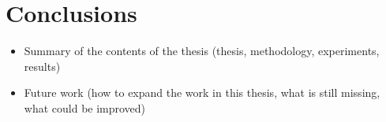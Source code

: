 \chapter{Conclusions}

\begin{itemize}
	\item Summary of the contents of the thesis (thesis, methodology, experiments, results)
	\item Future work (how to expand the work in this thesis, what is still missing, what could be improved)
\end{itemize}
